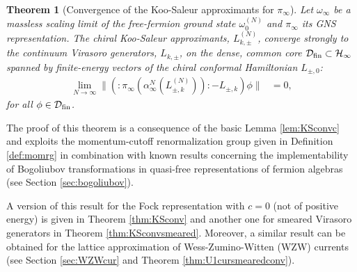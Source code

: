 \documentclass[a4paper, 11pt]{article}
\DeclareMathOperator{\1}{\mathds{1}}
\newtheorem{letterthm}{Theorem}
\begin{document}
\begin{letterthm}[Convergence of the Koo-Saleur approximants for $\pi_{\infty}$]
\label{thm:A}
Let $\omega_{\infty}$ be a massless scaling limit of the free-fermion ground state $\omega^{(N)}_{0}$ and $\pi_{\infty}$ its GNS representation. The chiral Koo-Saleur approximants, $L^{(N)}_{k,\pm}$, converge strongly to the continuum Virasoro generators, $L_{k,\pm}$, on the dense, common core $\mathcal{D}_{\textup{fin}}\subset\mathcal{H}_{\infty}$ spanned by finite-energy vectors of the chiral conformal Hamiltonian $L_{\pm,0}$:
\begin{align*}
\lim_{N\rightarrow\infty}\|(:\!\pi_{\infty}(\alpha^{N}_{\infty}(L^{(N)}_{\pm,k})\!)\!: - L_{\pm,k})\phi\| & = 0,
\end{align*}
for all $\phi\in\mathcal{D}_{\textup{fin}}$.
\end{letterthm}
The proof of this theorem is a consequence of the basic Lemma \ref{lem:KSconvc} and exploits the momentum-cutoff renormalization group given in Definition \ref{def:momrg} in combination with known results concerning the implementability of Bogoliubov transformations in quasi-free representations of fermion algebras (see Section \ref{sec:bogoliubov}).

A version of this result for the Fock representation with $c=0$ (not of positive energy) is given in Theorem \ref{thm:KSconv} and another one for smeared Virasoro generators in Theorem \ref{thm:KSconvsmeared}. Moreover, a similar result can be obtained for the lattice approximation of Wess-Zumino-Witten (WZW) currents (see Section \ref{sec:WZWcur} and Theorem \ref{thm:U1cursmearedconv}).

\bigskip
\end{document}
